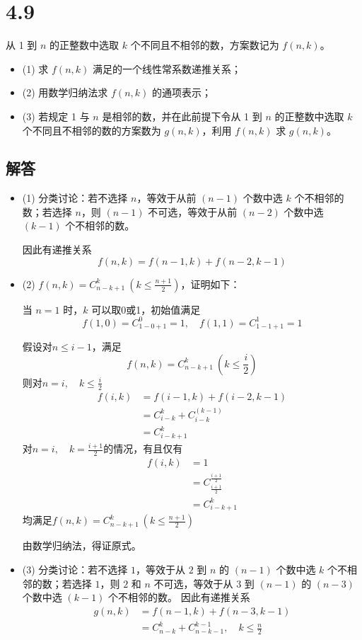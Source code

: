 \documentclass[12pt]{article}
\begin{document}
\section*{4.9}
从 1 到 \( n \) 的正整数中选取 \( k \) 个不同且不相邻的数，方案数记为 \( f(n, k) \)。
\begin{itemize}
    \item (1) 求 \( f(n, k) \) 满足的一个线性常系数递推关系；
    \item (2) 用数学归纳法求 \( f(n, k) \) 的通项表示；
    \item (3) 若规定 1 与 \( n \) 是相邻的数，并在此前提下令从 1 到 \( n \) 的正整数中选取 \( k \) 个不同且不相邻的数的方案数为 \( g(n, k) \)，利用 \( f(n, k) \) 求 \( g(n, k) \)。
\end{itemize}
\subsection*{解答}
\begin{itemize}
\item (1)
    分类讨论：若不选择 $n$，等效于从前 $(n-1)$ 个数中选 $k$ 个不相邻的数；若选择 $n$，则 $(n-1)$ 不可选，等效于从前 $(n-2)$ 个数中选 $(k-1)$ 个不相邻的数。
    
    因此有递推关系
    \[
    f(n, k) = f(n-1, k) + f(n-2, k-1)
    \]
\item (2)
    $f(n, k) = C^k_{n-k+1} \ (k \leq \frac{n+1}{2})$，证明如下：
    
    当 $n=1$ 时，$k$ 可以取0或1，初始值满足
    \[
    f(1, 0) = C^0_{1-0+1} = 1, \quad f(1, 1) = C^1_{1-1+1} = 1
    \]

    假设对$n \leq i-1$，满足 \[f(n, k) = C^k_{n-k+1} \ (k \leq \frac{i}{2})\]
    则对$n=i, \quad k \leq \frac{i}{2}$
    \begin{align}
    f(i, k) &= f(i-1, k) + f(i-2, k-1) \\
    &= C^k_{i-k} + C^(k-1)_{i-k} \\
    &= C^k_{i-k+1}
    \end{align}
    对$n=i, \quad k = \frac{i+1}{2}$的情况，有且仅有
    \begin{align}
    f(i,k) &= 1 \\
    & = C^{\frac{i+1}{2}}_{\frac{i+1}{2}} \\
    & = C^{k}_{i-k+1}
    \end{align}
    均满足$f(n, k) = C^k_{n-k+1} \ (k \leq \frac{n+1}{2})$
    
    由数学归纳法，得证原式。
\item (3)
    分类讨论：若不选择 $1$，等效于从 $2$ 到 $n$ 的 $(n-1)$ 个数中选 $k$ 个不相邻的数；若选择 $1$，则 $2$ 和 $n$ 不可选，等效于从 $3$ 到 $(n-1)$ 的 $(n-3)$ 个数中选 $(k-1)$ 个不相邻的数。
    因此有递推关系
    \begin{align}
    g(n,k) &= f(n-1,k)+f(n-3,k-1) \\
    &= C^k_{n-k} + C^{k-1}_{n-k-1}, \quad k \leq \frac{n}{2}
    \end{align}
\end{itemize}
\end{document}
